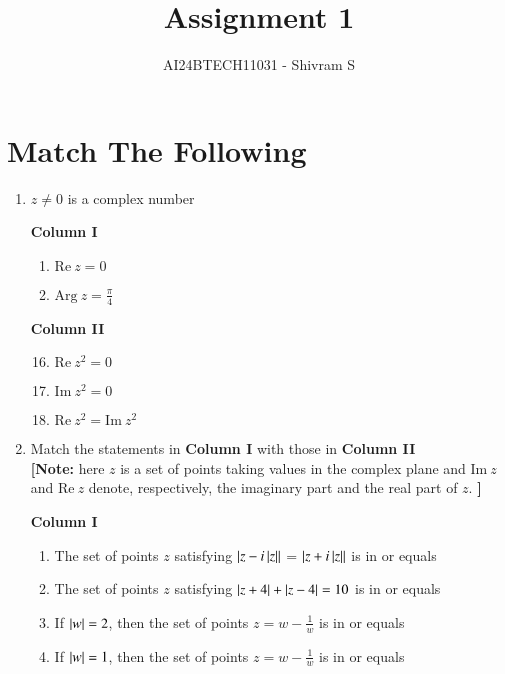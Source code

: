 \documentclass[journal,12pt,twocolumn]{IEEEtran}
\theoremstyle{remark}
\newcommand{\RE}{\mathrm{Re}}
\newcommand{\IM}{\mathrm{Im}}
\begin{document}


\title{Assignment 1}
\author{AI24BTECH11031 - Shivram S}
\maketitle
\newpage
\bigskip

\renewcommand{\thefigure}{\theenumi}
\renewcommand{\thetable}{\theenumi}
\section{Match The Following}

\begin{enumerate}[label=\arabic*)]
	\item $z \ne 0$ is a complex number
		\hfill {}

		\begin{multicols}{2}
			\textbf{Column I}
			\begin{enumerate}[label=(\Alph*)]
				\item $\RE\ z = 0$
				\item $\mathrm{Arg}\ z = \frac{\pi}{4}$
			\end{enumerate}
			\columnbreak
			\textbf{Column II}
			\begin{enumerate}[label=(\alph*)]
					\setcounter{enumii}{15}
				\item $\RE\ z^2 = 0$
				\item $\IM\ z^2 = 0$
				\item $\RE\ z^2 = \IM\ z^2$
			\end{enumerate}
		\end{multicols}

	\item Match the statements in \textbf{Column I} with those in \textbf{Column II}
		\hfill {} \\
		\textbf{[Note:} here $z$ is a set of points taking values in the complex plane and $\IM\ z$ and $\RE\ z$
		denote, respectively, the imaginary part and the real part of $z$. \textbf{]}

		\textbf{Column I}
		\begin{enumerate}[label=(\Alph*)]
			\item The set of points $z$ satisfying $\left\vert z - i\left\vert z\right\vert\right\vert$ = $\left\vert z + i\left\vert z\right\vert\right\vert$ is in or equals
			\item The set of points $z$ satisfying $\left\vert z + 4\right\vert + \left\vert z - 4\right\vert = 10$ is in or equals
			\item If $\left\vert w\right\vert = 2$, then the set of points $z = w - \frac{1}{w}$ is in or equals
			\item If $\left\vert w\right\vert = 1$, then the set of points $z = w - \frac{1}{w}$ is in or equals
		\end{enumerate}


\end{enumerate}
\end{document}
